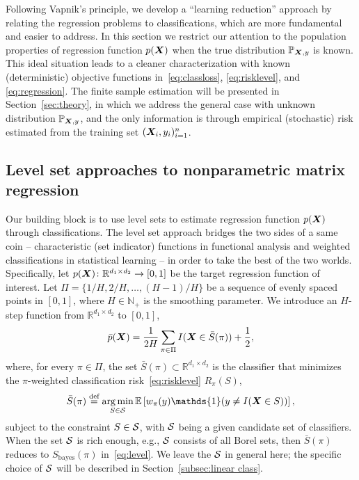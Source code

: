 \documentclass[12pt]{article}
\begin{document}
Following Vapnik's principle, we develop a ``learning reduction'' approach by relating the regression problems to classifications, which are more fundamental and easier to address. In this section we restrict our attention to the population properties of regression function $p(\bm X)$ when the true distribution $\mathbb{P}_{\bm X,y}$ is known. This ideal situation leads to a cleaner characterization with known (deterministic) objective functions in~\eqref{eq:classloss}, \eqref{eq:risklevel}, and \eqref{eq:regression}. The finite sample estimation will be presented in Section~\ref{sec:theory}, in which we address the general case with unknown distribution $\mathbb{P}_{\bm X,y}$, and the only information is through empirical (stochastic) risk estimated from the training set $(\bm X_i,y_i)_{i=1}^n$. 


\subsection{Level set approaches to nonparametric matrix regression}\label{sec:bridge}
Our building block is to use level sets to estimate regression function $p(\bm X)$ through classifications. The level set approach bridges the two sides of a same coin -- characteristic (set indicator) functions in functional analysis and weighted classifications in statistical learning -- in order to take the best of the two worlds. Specifically, let $p(\bm X)\colon \mathbb{R}^{d_1\times d_2}\to [0,1]$ be the target regression function of interest. Let $\Pi=\{{1/H}, {2/H}, \ldots, {(H-1)/ H} \}$ be a sequence of evenly spaced points in $[0,1]$, where $H\in\mathbb{N}_{+}$ is the smoothing parameter. We introduce an $H$-step function from $\mathbb{R}^{d_1\times d_2}$ to $[0,1]$,
\begin{equation}\label{eq:stepfunction}
\bar p(\bm X)= {1\over 2H}  \sum_{\pi \in \Pi} I(\bm X\in \bar S(\pi))+{1\over 2},
\end{equation}
where, for every $\pi\in\Pi$, the set $\bar S(\pi)\subset \mathbb{R}^{d_1\times d_2}$ is the classifier that minimizes the $\pi$-weighted classification risk~\eqref{eq:risklevel} $R_\pi(S)$,
\begin{equation}\label{eq:constrained}
\bar S(\pi) \stackrel{\text{def}}{=} \argmin_{S\in \tS}\mathbb{E}\left[ w_{\pi}(y)\mathds{1}(y\neq I(\mX\in S))\right],
\end{equation}
subject to the constraint $S\in\mathcal{S}$, with $\mathcal{S}$ being a given candidate set of classifiers. 
When the set $\mathcal{S}$ is rich enough, e.g., $\mathcal{S}$ consists of all Borel sets, then $\bar S(\pi)$ reduces to $S_{\text{bayes}}(\pi)$ in~\eqref{eq:level}. We leave the $\mathcal{S}$ in general here; the specific choice of $\mathcal{S}$ will be described in Section~\ref{subsec:linear class}. 
\end{document}

